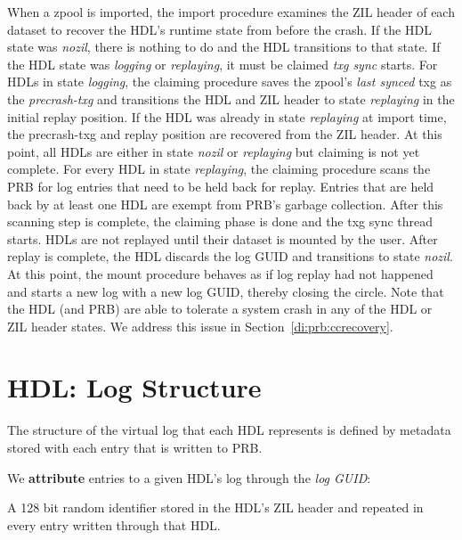 \documentclass[12pt,a4paper,twoside]{book}
\begin{document}
When a zpool is imported, the import procedure examines the ZIL header of each dataset to recover the HDL's runtime state from before the crash.
If the HDL state was \textit{nozil}, there is nothing to do and the HDL transitions to that state.
If the HDL state was \textit{logging} or \textit{replaying}, it must be claimed \textit{txg sync} starts.
For HDLs in state \textit{logging}, the claiming procedure saves the zpool's \textit{last synced} txg as the \textit{precrash-txg} and transitions the HDL and ZIL header to state \textit{replaying} in the initial replay position.
If the HDL was already in state \textit{replaying} at import time, the precrash-txg and replay position are recovered from the ZIL header.
At this point, all HDLs are either in state \textit{nozil} or \textit{replaying} but claiming is not yet complete.
For every HDL in state \textit{replaying}, the claiming procedure scans the PRB for log entries that need to be held back for replay.
Entries that are held back by at least one HDL are exempt from PRB's garbage collection.
After this scanning step is complete, the claiming phase is done and the txg sync thread starts.
HDLs are not replayed until their dataset is mounted by the user. %
After replay is complete, the HDL discards the log GUID and transitions to state \textit{nozil}.
At this point, the mount procedure behaves as if log replay had not happened and starts a new log with a new log GUID, thereby closing the circle.
Note that the HDL (and PRB) are able to tolerate a system crash in any of the HDL or ZIL header states.
We address this issue in Section~\ref{di:prb:ccrecovery}.

\section{HDL: Log Structure}\label{di:prb:logstructure}
The structure of the virtual log that each HDL represents is defined by metadata stored with each entry that is written to PRB.

We \textbf{attribute} entries to a given HDL's log through the \textit{log GUID}:
\begin{description}[noitemsep,leftmargin=1.5cm,labelindent=1cm]
    \item[Log GUID] A 128 bit random identifier stored in the HDL's ZIL header and repeated in every entry written through that HDL.
\end{description}
\end{document}
